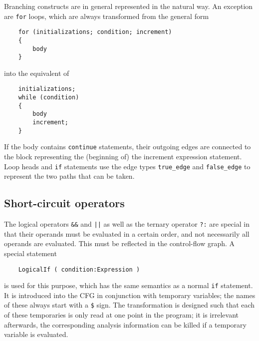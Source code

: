 \documentclass[12pt]{article}
\begin{document}
Branching constructs are in general represented in the natural way.
An exception are \lstinline|for| loops, which are always transformed
from the general form
\begin{lstlisting}
    for (initializations; condition; increment)
    {
        body
    }
\end{lstlisting}
into the equivalent of
\begin{lstlisting}
    initializations;
    while (condition)
    {
        body
        increment;
    }
\end{lstlisting}
If the body contains \lstinline|continue| statements, their outgoing
edges are connected to the block representing the (beginning of) the
increment expression statement. Loop heads and \lstinline|if|
statements use the edge types \verb|true_edge| and \verb|false_edge|
to represent the two paths that can be taken.

\subsection{Short-circuit operators}

The logical operators \lstinline|&&| and \lstinline&||& as well as
the ternary operator \lstinline|?:| are special in that their
operands must be evaluated in a certain order, and not necessarily
all operands are evaluated. This must be reflected in the
control-flow graph. A special statement
\begin{verbatim}
    LogicalIf ( condition:Expression )
\end{verbatim}
is used for this purpose, which has the same semantics as a normal
\lstinline|if| statement. It is introduced into the CFG in
conjunction with temporary variables; the names of these always
start with a \lstinline|$| sign. The transformation is designed such
that each of these temporaries is only read at one point in the
program; it is irrelevant afterwards, the corresponding analysis
information can be killed if a temporary variable is evaluated.
\end{document}
